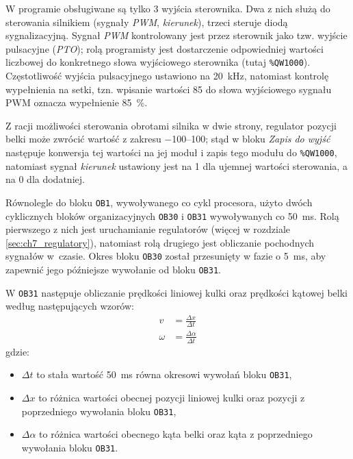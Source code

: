 W programie obsługiwane są tylko \num{3} wyjścia sterownika. Dwa z nich służą do sterowania silnikiem (sygnały \textit{PWM}, \textit{kierunek}), trzeci steruje diodą sygnalizacyjną. Sygnał \textit{PWM} kontrolowany jest przez sterownik jako tzw. wyjście pulsacyjne (\textit{PTO}); rolą programisty jest dostarczenie odpowiedniej wartości liczbowej do konkretnego słowa wyjściowego sterownika (tutaj \texttt{\%QW1000}). Częstotliwość wyjścia pulsacyjnego ustawiono na \SI{20}{\kilo\hertz}, natomiast kontrolę wypełnienia na setki, tzn. wpisanie wartości \num{85} do słowa wyjściowego sygnału PWM oznacza wypełnienie \SI{85}{\percent}.

Z racji możliwości sterowania obrotami silnika w dwie strony, regulator pozycji belki może zwrócić wartość z zakresu \numrange[range-phrase={ do }]{-100}{100}; stąd w bloku \textit{Zapis do wyjść} następuje konwersja tej wartości na jej moduł i zapis tego modułu do \texttt{\%QW1000}, natomiast sygnał \textit{kierunek} ustawiony jest na \num{1} dla ujemnej wartości sterowania, a na \num{0} dla dodatniej.

Równolegle do bloku \texttt{OB1}, wywoływanego co cykl procesora, użyto dwóch cyklicznych bloków organizacyjnych \texttt{OB30} i \texttt{OB31} wywoływanych co \SI{50}{\milli\second}. Rolą pierwszego z nich jest uruchamianie regulatorów (więcej w rozdziale \ref{sec:ch7_regulatory}), natomiast rolą drugiego jest obliczanie pochodnych sygnałów w~czasie. Okres bloku \texttt{OB30} został przesunięty w fazie o \SI{5}{\milli\second}, aby zapewnić jego późniejsze wywołanie od bloku \texttt{OB31}.

W \texttt{OB31} następuje obliczanie prędkości liniowej kulki oraz prędkości kątowej belki według następujących wzorów:
\begin{align*}
    v &= \frac{\Delta x}{\Delta t} \\
    \omega &= \frac{\Delta \alpha}{\Delta t}
\end{align*}
gdzie:
\begin{itemize}
    \item $\Delta t$ to stała wartość \SI{50}{\milli\second} równa okresowi wywołań bloku \texttt{OB31},
    \item $\Delta x$ to różnica wartości obecnej pozycji liniowej kulki oraz pozycji z poprzedniego wywołania bloku \texttt{OB31},
    \item $\Delta \alpha$ to różnica wartości obecnego kąta belki oraz kąta z poprzedniego wywołania bloku \texttt{OB31}.
\end{itemize}

